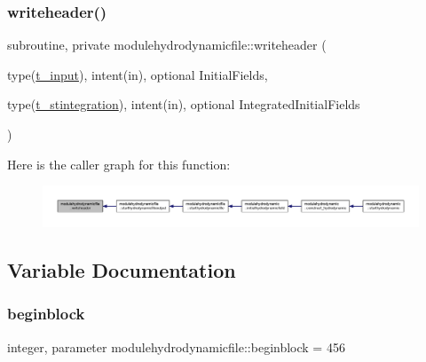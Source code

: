 \subsubsection{\texorpdfstring{writeheader()}{writeheader()}}
{\footnotesize\ttfamily subroutine, private modulehydrodynamicfile\+::writeheader (\begin{DoxyParamCaption}\item[{type(\mbox{\hyperlink{structmodulehydrodynamicfile_1_1t__input}{t\+\_\+input}}), intent(in), optional}]{Initial\+Fields,  }\item[{type(\mbox{\hyperlink{structmodulehydrodynamicfile_1_1t__stintegration}{t\+\_\+stintegration}}), intent(in), optional}]{Integrated\+Initial\+Fields }\end{DoxyParamCaption})\hspace{0.3cm}{\ttfamily [private]}}

Here is the caller graph for this function\+:\nopagebreak
\begin{figure}[H]
\begin{center}
\leavevmode
\includegraphics[width=350pt]{namespacemodulehydrodynamicfile_ad777d9126fa56a82299811343a399ea8_icgraph}
\end{center}
\end{figure}


\subsection{Variable Documentation}
\mbox{\label{namespacemodulehydrodynamicfile_aa9a0102373e2ba53486502369dce4f77}} 
\subsubsection{\texorpdfstring{beginblock}{beginblock}}
{\footnotesize\ttfamily integer, parameter modulehydrodynamicfile\+::beginblock = 456\hspace{0.3cm}{\ttfamily [private]}}

\mbox{\label{namespacemodulehydrodynamicfile_a54c91753549bee1b5964361ce467d536}} 
